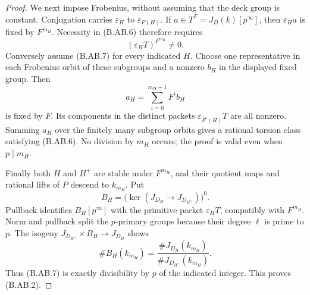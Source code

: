 \begin{proof}
We next impose Frobenius, without assuming that the deck group
is constant. Conjugation carries $\varepsilon_H$ to
$\varepsilon_{F(H)}$. If $a\in T^F=J_D(k)[p^\infty]$,
then $\varepsilon_Ha$ is fixed by $F^{m_H}$. Necessity in
(B.AB.6) therefore requires
\[
                         (\varepsilon_HT)^{F^{m_H}}\ne0.        \tag{B.AB.7}
\]
Conversely assume (B.AB.7) for every indicated $H$.
Choose one representative in each Frobenius orbit of these
subgroups and a nonzero $b_H$ in the displayed fixed group.
Then
\[
                  a_H=\sum_{i=0}^{m_H-1}F^i b_H
\]
is fixed by $F$. Its components in the distinct packets
$\varepsilon_{F^i(H)}T$ are all nonzero. Summing $a_H$ over
the finitely many subgroup orbits gives a rational torsion
class satisfying (B.AB.6). No division by $m_H$ occurs;
the proof is valid even when $p\mid m_H$.

Finally both $H$ and $H^+$ are stable under $F^{m_H}$, and
their quotient maps and rational lifts of $P$ descend to
$k_{m_H}$. Put
\[
 B_H=\bigl(\ker(J_{D_H}\longrightarrow J_{D_{H^+}})\bigr)^0.
\]
Pullback identifies $B_H[p^\infty]$ with the primitive packet
$\varepsilon_HT$, compatibly with $F^{m_H}$. Norm and
pullback split the $p$-primary groups because their degree
$\ell$ is prime to $p$. The isogeny
$J_{D_{H^+}}\times B_H\to J_{D_H}$ shows
\[
 \#B_H(k_{m_H})
       =\frac{\#J_{D_H}(k_{m_H})}{\#J_{D_{H^+}}(k_{m_H})}.
\]
Thus (B.AB.7) is exactly divisibility by $p$ of the indicated
integer. This proves (B.AB.2).
\end{proof}

